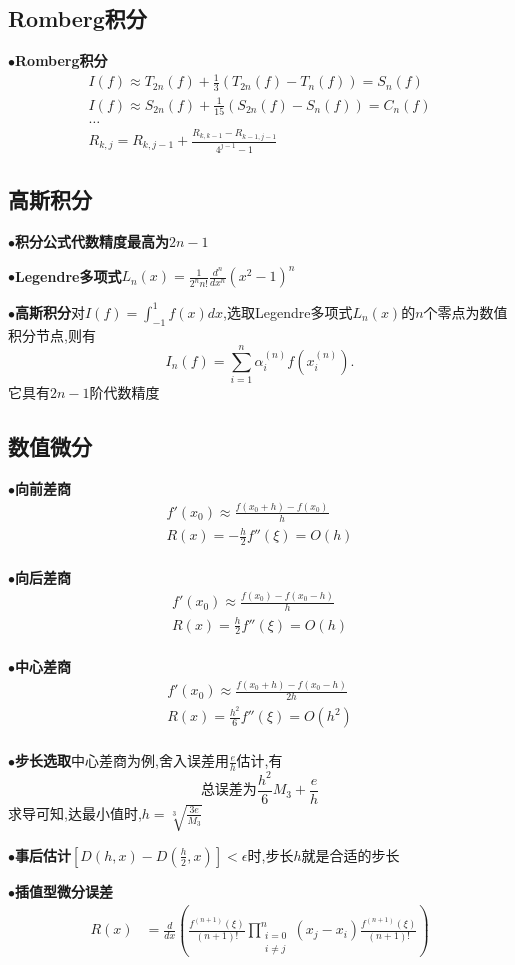 \documentclass[UTF8]{article}
\newcommand{\keypoint}[2]{$\bullet$\textbf{#1}\quad#2\par}
\begin{document}
\subsection{Romberg积分}
\keypoint{Romberg积分}{
	$$
	\begin{array}{l}
	I(f)\approx T_{2n}(f)+\frac{1}{3}(T_{2n}(f)-T_n(f))=S_n(f)\\
	I(f)\approx S_{2n}(f)+\frac{1}{15}(S_{2n}(f)-S_n(f))=C_n(f)\\
	\dots\\
	R_{k,j}=R_{k,j-1}+\frac{R_{k,k-1}-R_{k-1,j-1}}{4^{j-1}-1}
	\end{array}
	$$
}
\subsection{高斯积分}
\keypoint{积分公式代数精度最高为$2n-1$}{}
\keypoint{Legendre多项式}{$L_n(x)=\frac{1}{2^nn!}\frac{d^n}{dx^n}(x^2-1)^n$}
\keypoint{高斯积分}{对$I(f)=\int_{-1}^{1}f(x)dx$,选取Legendre多项式$L_n(x)$的$n$个零点为数值积分节点,则有
	$$I_n(f)=\sum\limits_{i=1}^{n}\alpha_i^{(n)}f(x_i^{(n)}).$$
	它具有$2n-1$阶代数精度
}
\subsection{数值微分}
\keypoint{向前差商}{
	$$
	\begin{array}{l}
	f'(x_0)\approx\frac{f(x_0+h)-f(x_0)}{h}\\
	R(x)=-\frac{h}{2}f''(\xi)=O(h)\\
	\end{array}
	$$
}
\keypoint{向后差商}{
	$$
	\begin{array}{l}
	f'(x_0)\approx\frac{f(x_0)-f(x_0-h)}{h}\\
	R(x)=\frac{h}{2}f''(\xi)=O(h)\\
	\end{array}
	$$
}
\keypoint{中心差商}{
	$$
	\begin{array}{l}
	f'(x_0)\approx\frac{f(x_0+h)-f(x_0-h)}{2h}\\
	R(x)=\frac{h^2}{6}f''(\xi)=O(h^2)\\
	\end{array}
	$$
}
\keypoint{步长选取}{中心差商为例,舍入误差用$\frac{e}{h}$估计,有
	$$\mbox{总误差为}\frac{h^2}{6}M_3+\frac{e}{h}$$
	求导可知,达最小值时,$h=\sqrt[3]{\frac{3e}{M_3}}$
}
\keypoint{事后估计}{$\left[D(h,x)-D(\frac{h}{2},x)\right]<\epsilon$时,步长$h$就是合适的步长}
\keypoint{插值型微分误差}{
	\begin{align*}
	R(x)&=\frac{d}{dx}\left(\frac{f^{(n+1)}(\xi)}{(n+1)!}\prod\limits_{\substack{i=0\\i\not=j}}^{n}(x_j-x_i)\frac{f^{(n+1)}(\xi)}{(n+1)!}\right)
	\end{align*}
}
\end{document}
